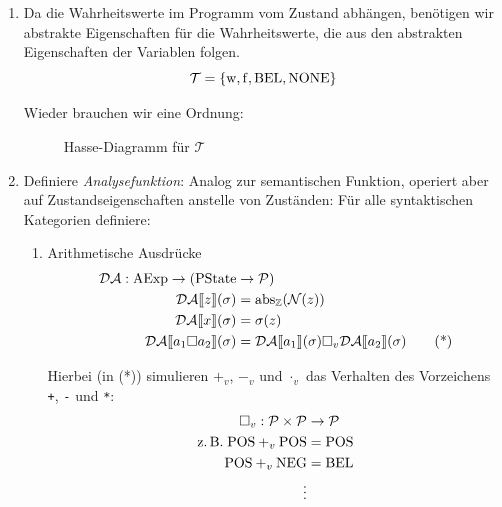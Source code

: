 \begin{enumerate}
    \item Da die Wahrheitswerte im Programm vom Zustand abhängen, benötigen wir abstrakte Eigenschaften für die Wahrheitswerte, die aus den abstrakten Eigenschaften der Variablen folgen. \[
            \mathcal{T} = \{ \operatorname{w}, \operatorname{f}, \text{BEL}, \text{NONE} \}
        \]

        Wieder brauchen wir eine Ordnung:
        \begin{figure}[H]
            \centering
            \caption{Hasse-Diagramm für $\mathcal{T}$}
        \end{figure}

    \item Definiere \emph{Analysefunktion}: Analog zur semantischen Funktion, operiert aber auf Zustandseigenschaften anstelle von Zuständen: Für alle syntaktischen Kategorien definiere:

        \begin{enumerate}
            \item Arithmetische Ausdrücke \begin{align*}
                    \mathcal{DA} : \operatorname{AExp} \to (\operatorname{PState} & \to \mathcal{P}) \\
                    \mathcal{DA}\mathrm{[}\kern-.14em\mathrm{[} z \mathrm{]}\kern-.14em\mathrm{]}(\sigma) & = \operatorname{abs}_{\mathbb{Z}}(\mathcal{N}(z)) \\
                    \mathcal{DA}\mathrm{[}\kern-.14em\mathrm{[} x \mathrm{]}\kern-.14em\mathrm{]}(\sigma) & = \sigma(z) \\
                    \mathcal{DA}\mathrm{[}\kern-.14em\mathrm{[} a_1 \square a_2 \mathrm{]}\kern-.14em\mathrm{]}(\sigma) & = \mathcal{DA}\mathrm{[}\kern-.14em\mathrm{[} a_1 \mathrm{]}\kern-.14em\mathrm{]}(\sigma) \square_v \mathcal{DA}\mathrm{[}\kern-.14em\mathrm{[} a_2 \mathrm{]}\kern-.14em\mathrm{]}(\sigma) \tag{*} \\
                \end{align*}

                Hierbei (in (*)) simulieren $+_v$, $-_v$ und $\cdot_v$ das Verhalten des Vorzeichens \texttt{+}, \texttt{-} und \texttt{*}:
                \begin{align*}
                    \square_v : \mathcal{P} \times \mathcal{P} & \to \mathcal{P} \\
                    \text{z.\,B.{}} \; \text{POS} +_v \text{POS} & = \text{POS} \\
                    \text{POS} +_v \text{NEG} & = \text{BEL} \\
                    \vdots
                \end{align*}


\end{enumerate}
\end{enumerate}
